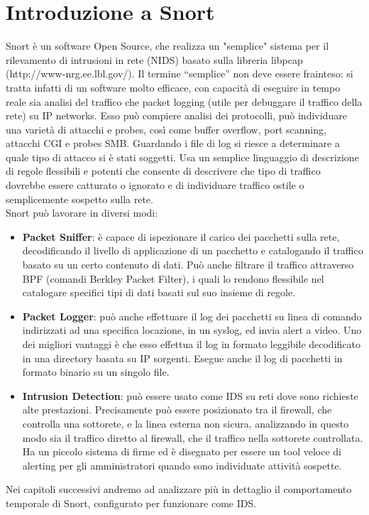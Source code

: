 \chapter*{Introduzione a Snort}
Snort è un software Open Source, che realizza un "semplice" sistema per il rilevamento di intrusioni in rete (NIDS) basato sulla libreria libpcap (http://www-nrg.ee.lbl.gov/). Il termine ``semplice'' non deve essere frainteso: si tratta infatti di un software molto efficace, con capacità di eseguire in tempo reale sia analisi del traffico che packet logging (utile per debuggare il traffico della rete) su IP networks. Esso può compiere analisi dei protocolli, può individuare una varietà di attacchi e probes, così come buffer overflow, port scanning, attacchi CGI e probes SMB. Guardando i file di log si riesce a determinare a quale tipo di attacco si è stati soggetti. Usa un semplice linguaggio di descrizione di regole flessibili e potenti che consente di descrivere che tipo di traffico dovrebbe essere catturato o ignorato e di individuare traffico ostile o semplicemente sospetto sulla rete.\\
Snort può lavorare in diversi modi:

\begin{itemize}
\item \textbf{Packet Sniffer}: è capace di ispezionare il carico dei pacchetti sulla rete, decodificando il livello di applicazione di un pacchetto e catalogando il traffico basato su un certo contenuto di dati. Può anche filtrare il traffico attraverso BPF (comandi Berkley Packet Filter), i quali lo rendono flessibile nel catalogare specifici tipi di dati basati sul suo insieme di regole.

\item \textbf{Packet Logger}: può anche effettuare il log dei pacchetti su linea di comando indirizzati ad una specifica locazione, in un syslog, ed invia alert a video. Uno dei migliori vantaggi è che esso effettua il log in formato leggibile decodificato in una directory basata su IP sorgenti. Esegue anche il log di pacchetti in formato binario su un singolo file.

\item \textbf{Intrusion Detection}: può essere usato come IDS su reti dove sono richieste alte prestazioni. Precisamente può essere posizionato tra il firewall, che controlla una sottorete, e la linea esterna non sicura, analizzando in questo modo sia il traffico diretto al firewall, che il traffico nella sottorete controllata. Ha un piccolo sistema di firme ed è disegnato per essere un tool veloce di alerting per gli amministratori quando sono individuate attività sospette.

\end{itemize}

Nei capitoli successivi andremo ad analizzare più in dettaglio il comportamento temporale di Snort, configurato per funzionare come IDS.

